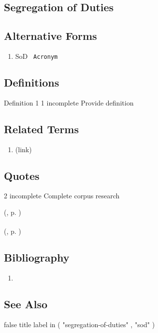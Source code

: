 \newpage \subsection*{Segregation of Duties } \subsection*{Alternative Forms } \begin{enumerate} \item  SoD  \texttt{ Acronym  } \end{enumerate} \subsection*{Definitions } \begin{DIC_Def}{Definition 1 }{} 1  incomplete  Provide definition  \end{DIC_Def} \subsection*{Related Terms } \begin{enumerate} \item  (link) \href{4-Eyes Principle (Dictionary Entry) }{ }   \end{enumerate} \subsection*{Quotes } 2  incomplete  Complete corpus research  \begin{DIC_BlockQuote}   \end{DIC_BlockQuote} (, p. )  \paragraph{} (, p. )  \subsection*{Bibliography } \begin{enumerate} \item  \end{enumerate} \subsection*{See Also } false  title  label in ( "segregation-of-duties" , "sod" )  